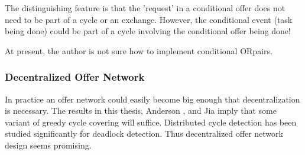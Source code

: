 \documentclass[main.tex]{subfiles}
\begin{document}
The distinguishing feature is that the 'request' in a conditional offer does not need to be part of a cycle or an exchange. However, the conditional event (task being done) could be part of a cycle involving the conditional offer being done!

At present, the author is not sure how to implement conditional ORpairs.

\subsubsection{Decentralized Offer Network}
In practice an offer network could easily become big enough that decentralization is necessary. The results in this thesis, Anderson \cite{And1}, and Jia \cite{Jia1} imply that some variant of greedy cycle covering will suffice. Distributed cycle detection has been studied significantly for deadlock detection. Thus decentralized offer network design seems promising.
\end{document}
